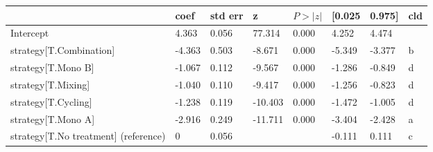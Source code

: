 \begin{tabular}{llllllll}
\toprule
 & coef & std err & z & $P>|z|$ & [0.025 & 0.975] & cld \\
\midrule
Intercept & 4.363 & 0.056 &    77.314 &  0.000 & 4.252 & 4.474 &  \\
strategy[T.Combination] & -4.363 & 0.503 &    -8.671 &  0.000 & -5.349 & -3.377 & b \\
strategy[T.Mono B] & -1.067 & 0.112 &    -9.567 &  0.000 & -1.286 & -0.849 & d \\
strategy[T.Mixing] & -1.040 & 0.110 &    -9.417 &  0.000 & -1.256 & -0.823 & d \\
strategy[T.Cycling] & -1.238 & 0.119 &   -10.403 &  0.000 & -1.472 & -1.005 & d \\
strategy[T.Mono A] & -2.916 & 0.249 &   -11.711 &  0.000 & -3.404 & -2.428 & a \\
strategy[T.No treatment] (reference) & 0 & 0.056 &  &  & -0.111 & 0.111 & c \\
\bottomrule
\end{tabular}
